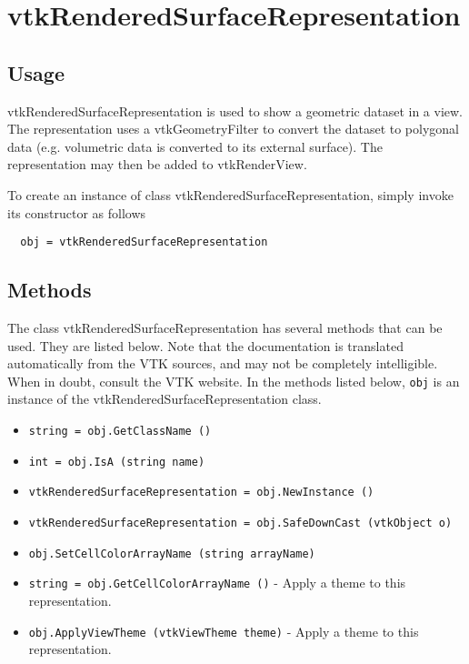 \section{vtkRenderedSurfaceRepresentation}

\subsection{Usage}

 vtkRenderedSurfaceRepresentation is used to show a geometric dataset in a view.
 The representation uses a vtkGeometryFilter to convert the dataset to
 polygonal data (e.g. volumetric data is converted to its external surface).
 The representation may then be added to vtkRenderView.

To create an instance of class vtkRenderedSurfaceRepresentation, simply
invoke its constructor as follows
\begin{verbatim}
  obj = vtkRenderedSurfaceRepresentation
\end{verbatim}
\subsection{Methods}

The class vtkRenderedSurfaceRepresentation has several methods that can be used.
  They are listed below.
Note that the documentation is translated automatically from the VTK sources,
and may not be completely intelligible.  When in doubt, consult the VTK website.
In the methods listed below, \verb|obj| is an instance of the vtkRenderedSurfaceRepresentation class.
\begin{itemize}
\item  \verb|string = obj.GetClassName ()|

\item  \verb|int = obj.IsA (string name)|

\item  \verb|vtkRenderedSurfaceRepresentation = obj.NewInstance ()|

\item  \verb|vtkRenderedSurfaceRepresentation = obj.SafeDownCast (vtkObject o)|

\item  \verb|obj.SetCellColorArrayName (string arrayName)|

\item  \verb|string = obj.GetCellColorArrayName ()| -  Apply a theme to this representation.

\item  \verb|obj.ApplyViewTheme (vtkViewTheme theme)| -  Apply a theme to this representation.

\end{itemize}
